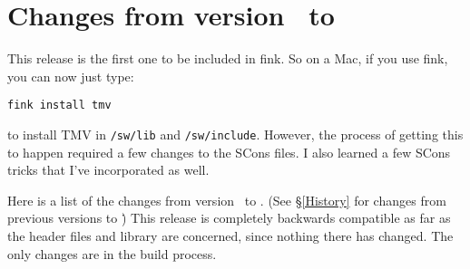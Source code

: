
\section{Changes from version \prevtmvversion\ to \tmvversion}
\label{Changes}

This release is the first one to be included in fink.  So on a Mac, if you use fink, you can now just type: 
\begin{verbatim}
fink install tmv
\end{verbatim}
to install TMV in \texttt{/sw/lib} and \texttt{/sw/include}.
However, the process of getting this to happen required a few changes to the SCons files.  I also learned a few SCons tricks that I've incorporated as well.

Here is a list of the changes from version \prevtmvversion\ to \tmvversion.  
(See \S\ref{History} for changes from previous versions to \prevtmvversion\.)
This release is completely backwards compatible as far as the header files and library are concerned, since nothing there has changed.  The only changes are in the build process.

